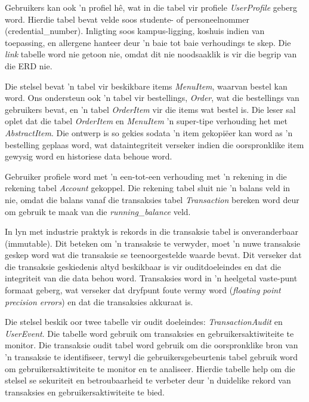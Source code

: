 Gebruikers kan ook 'n profiel hê, wat in die tabel vir profiele \textit{UserProfile}
geberg word. Hierdie tabel bevat velde soos studente- of personeelnommer
(credential\_number). Inligting soos kampus-ligging, koshuis indien van
toepassing, en allergene hanteer
deur 'n baie tot baie verhoudings te skep. Die \textit{link} tabelle word nie
getoon nie, omdat dit nie noodsaaklik is vir die begrip van die ERD nie.

Die stelsel bevat 'n tabel vir beskikbare items \textit{MenuItem}, waarvan bestel kan
word. Ons ondersteun ook 'n tabel vir bestellings, \textit{Order}, wat die
bestellings van gebruikers bevat, en 'n tabel \textit{OrderItem} vir die items
wat bestel is. Die leser sal oplet dat die tabel \textit{OrderItem} en
\textit{MenuItem} 'n super-tipe verhouding het met \textit{AbstractItem}. Die
ontwerp is so gekies sodata 'n item gekopi\"eer kan word as 'n bestelling
geplaas word, wat dataintegriteit verseker indien die oorspronklike item
gewysig word en historiese data behoue word.

Gebruiker profiele word met 'n een-tot-een verhouding met 'n rekening in die
rekening tabel \textit{Account} gekoppel. Die rekening tabel sluit nie 'n balans veld
in nie, omdat die balans vanaf die transaksies tabel \textit{Transaction} bereken word
deur om gebruik te maak van die \textit{running\_balance} veld. 

In lyn met industrie praktyk is rekords in die transaksie tabel is
onveranderbaar (immutable). Dit beteken om 'n transaksie te verwyder, moet 'n
nuwe transaksie geskep word wat die transaksie se teenoorgestelde waarde bevat.
Dit verseker dat die transaksie geskiedenis altyd beskikbaar is vir
ouditdoeleindes en dat die integriteit van die data behou word. Transaksies word
in 'n heelgetal vaste-punt formaat geberg, wat verseker dat dryfpunt foute vermy
word (\textit{floating point precision errors}) en dat die transaksies
akkuraat is.

Die stelsel beskik oor twee tabelle vir oudit doeleindes:
\textit{TransactionAudit} en \textit{UserEvent}. Die tabelle word gebruik om
transaksies en gebruikersaktiwiteite te monitor. Die transaksie oudit tabel word
gebruik om die oorspronklike bron van 'n transaksie te identifiseer, terwyl die 
gebruikersgebeurtenis tabel gebruik word om gebruikersaktiwiteite te monitor en
te analiseer. Hierdie tabelle help om die stelsel se sekuriteit en betroubaarheid
te verbeter deur 'n duidelike rekord van transaksies en gebruikersaktiwiteite
te bied.

